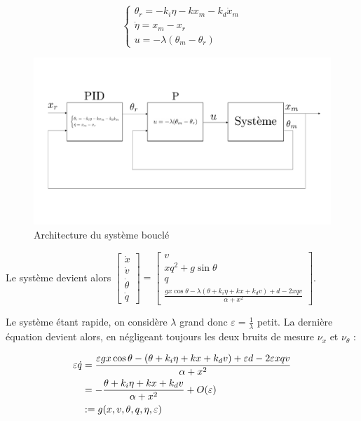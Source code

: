 \documentclass[10pt]{article}
\begin{document}
\[
	\begin{cases}
		\theta_r = - k_i \eta - k x_m - k_d \dot x_m \\
		\dot \eta = x_m - x_r \\
		u = - \lambda ( \theta_m - \theta_r )
	\end{cases}
\]

\begin{figure}[H]
	\centering
	\includegraphics[width=\linewidth]{schema.pdf}
	\caption{Architecture du système bouclé}
\end{figure}

\noindent Le système devient alors 
$\begin{bmatrix} 
	\dot x \\
	\dot v \\
	\dot \theta \\
	\dot q
\end{bmatrix} =
\begin{bmatrix} 
	v \\
	x q^2 + g \sin \theta \\
	q \\ 
	\frac{gx \cos \theta - \lambda ( \theta + k_i \eta + k x + k_d v ) +
	d - 2xqv}{\alpha + x^2}
\end{bmatrix}$.

\vspace{10px}

\noindent Le système étant rapide,
on considère $\lambda$ grand donc $\varepsilon = \frac{1}{\lambda}$ petit. La dernière équation devient alors,
en négligeant toujours les deux bruits de mesure $\nu_x$ et $\nu_\theta$ :

\begin{align}
	\varepsilon \dot q &= \frac{\varepsilon gx \cos \theta - ( \theta + k_i \eta + k x + k_d v ) +
	\varepsilon d - 2 \varepsilon xqv}{\alpha + x^2} \notag \\
	&= - \frac{\theta + k_i \eta + k x + k_d v}{\alpha + x^2} + O (\varepsilon) \notag \\
	&:= g (x, v, \theta, q, \eta, \varepsilon) \notag
\end{align}
\end{document}
